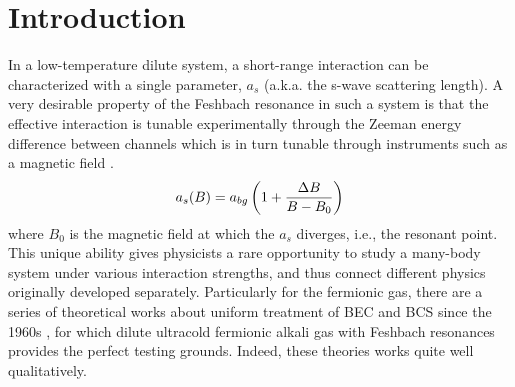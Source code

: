 \documentclass[reprint,pra]{revtex4-1}
\begin{document}
\section{Introduction}

In a low-temperature dilute system, a short-range interaction can be characterized with a single parameter, $a_s$ (a.k.a. the s-wave scattering length).    A very desirable property of the Feshbach resonance in such a system is that the effective interaction is tunable experimentally through the Zeeman energy difference between channels which is in turn  tunable through  instruments such as a magnetic field  \cite{Fano,nuclear,ChinRMP,Pethick}. 
 \begin{equation}
a_{s}(B)=a_{bg}\left(1+\frac{\Delta{B}}{B-B_{0}}\right)
\end{equation}
where $B_{0}$ is the magnetic field at which the $a_{s}$ diverges, i.e., the  resonant point. 
This unique ability gives physicists a rare opportunity to study  a many-body system under various interaction strengths,  and thus connect different physics originally developed separately.  Particularly for the fermionic gas, there are a series of  theoretical works about uniform treatment of  BEC and BCS since the 1960s \cite{Eagle,LeggettCrossover,Nozieres,RanderiaBEC}, for which dilute ultracold fermionic alkali gas with  Feshbach resonances provides the perfect testing grounds.  Indeed,  these theories works quite well  qualitatively.  

\end{document}
